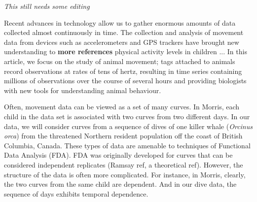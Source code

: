 


{\em{This still needs some editing}}

\vskip 10pt\noindent

Recent advances in technology allow us to gather enormous amounts of data collected almost continuously in time.
The collection and analysis of movement data from devices such as accelerometers and GPS trackers have brought new understanding to {\bf{more references}}  physical activity levels in children \citep{Morris:2007} ...
In this article, we focus on the study of animal movement;  tags attached to animals record observations at rates of tens of hertz, resulting in time series containing millions of observations over the course of several hours and providing biologists with new tools for understanding animal behaviour.


Often, movement data can be viewed as a set of many curves.   In Morris, each child in the data set is associated with two curves from two different days.   In our data, we will consider curves from a sequence of dives of one killer whale (\textit{Orcinus orca}) from the threatened Northern resident population off the coast of British Columbia, Canada. 
These types of data are amenable to techniques of Functional Data Analysis (FDA).
FDA was originally developed for curves that can be considered independent replicates  (Ramsay ref, a theoretical ref).  
However, the structure of the data is often more complicated.
For instance, in Morris, clearly, the two curves from the same child are dependent.
And in our dive data, the sequence of days exhibits temporal dependence.


